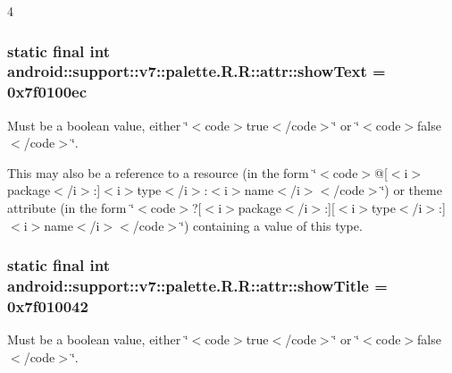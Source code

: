 4\hypertarget{classandroid_1_1support_1_1v7_1_1palette_1_1_r_1_1attr_2b1dbcc7ac1a936a9fdcea50a8443dc6}{
\subsubsection[{showText}]{\setlength{\rightskip}{0pt plus 5cm}static final int android::support::v7::palette.R.R::attr::showText = 0x7f0100ec}}
\label{classandroid_1_1support_1_1v7_1_1palette_1_1_r_1_1attr_2b1dbcc7ac1a936a9fdcea50a8443dc6}


Must be a boolean value, either \char`\"{}$<$code$>$true$<$/code$>$\char`\"{} or \char`\"{}$<$code$>$false$<$/code$>$\char`\"{}. 

This may also be a reference to a resource (in the form \char`\"{}$<$code$>$@\mbox{[}$<$i$>$package$<$/i$>$:\mbox{]}$<$i$>$type$<$/i$>$:$<$i$>$name$<$/i$>$$<$/code$>$\char`\"{}) or theme attribute (in the form \char`\"{}$<$code$>$?\mbox{[}$<$i$>$package$<$/i$>$:\mbox{]}\mbox{[}$<$i$>$type$<$/i$>$:\mbox{]}$<$i$>$name$<$/i$>$$<$/code$>$\char`\"{}) containing a value of this type. \hypertarget{classandroid_1_1support_1_1v7_1_1palette_1_1_r_1_1attr_6b3d4fa231e762889e4762967b0ac9ca}{
\subsubsection[{showTitle}]{\setlength{\rightskip}{0pt plus 5cm}static final int android::support::v7::palette.R.R::attr::showTitle = 0x7f010042}}
\label{classandroid_1_1support_1_1v7_1_1palette_1_1_r_1_1attr_6b3d4fa231e762889e4762967b0ac9ca}


Must be a boolean value, either \char`\"{}$<$code$>$true$<$/code$>$\char`\"{} or \char`\"{}$<$code$>$false$<$/code$>$\char`\"{}. 

